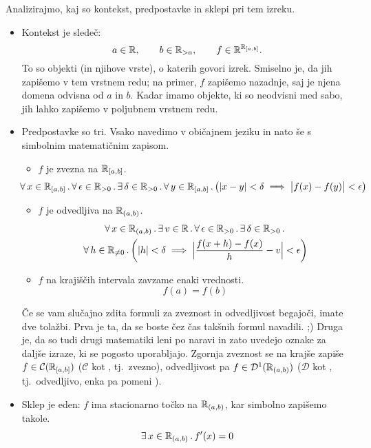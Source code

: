 	Analizirajmo, kaj so kontekst, predpostavke in sklepi pri tem izreku.
	
	\begin{itemize}
		\item
			Kontekst je sledeč:
			\[a \in \mathbb{R}, \qquad b \in \mathbb{R}_{> a}, \qquad f \in \mathbb{R}^{{\mathbb{R}}_{[a, b]}}.\]
			To so objekti (in njihove vrste), o katerih govori izrek. Smiselno je, da jih zapišemo v tem vrstnem redu; na primer, $f$ zapišemo nazadnje, saj je njena domena odvisna od $a$ in $b$. Kadar imamo objekte, ki so neodvisni med sabo, jih lahko zapišemo v poljubnem vrstnem redu.
		\item
			Predpostavke so tri. Vsako navedimo v običajnem jeziku in nato še s simbolnim matematičnim zapisom.
			\begin{itemize}
				\item
					$f$ je zvezna na ${\mathbb{R}}_{[a, b]}$.
					\[
						\hspace{-2em}
						\xall{x}[\intcc{a}{b}]{
							\xall{\epsilon}[\RR_{> 0}]{
								\xsome{\delta}[\RR_{> 0}]{
									\all{y}[\intcc{a}{b}]{
										|x - y| < \delta \implies \big|f(x) - f(y)\big| < \epsilon
									}
								}
							}
						}
					\]
				\item
					$f$ je odvedljiva na ${\mathbb{R}}_{(a, b)}$.
					\begin{multline*}
						\xall{x}[\intoo{a}{b}]{
							\xsome{v}[\RR]{
								\xall{\epsilon}[\RR_{> 0}]{
									\xsome{\delta}[\RR_{> 0}]{
									}
								}
							}
						}\\
						\all{h}[\RR_{\neq 0}]{
							|h| < \delta \implies \Big|\frac{f(x + h) - f(x)}{h} - v\Big| < \epsilon
						}
					\end{multline*}
				\item
					$f$ na krajiščih intervala zavzame enaki vrednosti.
					\[f(a) = f(b)\]
			\end{itemize}
			Če se vam slučajno zdita formuli za zveznost in odvedljivost begajoči, imate dve tolažbi. Prva je ta, da se boste čez čas takšnih formul navadili. ;) Druga je, da so tudi drugi matematiki leni po naravi in zato uvedejo oznake za daljše izraze, ki se pogosto uporabljajo. Zgornja zveznost se na krajše zapiše $f \in \mathcal{C}({\mathbb{R}}_{[a, b]})$ ($\mathcal{C}$ kot , tj.~zvezno), odvedljivost pa $f \in \mathcal{D}^1({\mathbb{R}}_{(a, b)})$ ($\mathcal{D}$ kot , tj.~odvedljivo, enka pa pomeni ).
		\item
			Sklep je eden: $f$ ima stacionarno točko na ${\mathbb{R}}_{(a, b)}$, kar simbolno zapišemo takole.
			\[\xsome{x}[\intoo{a}{b}]{f'(x) = 0}\]
	\end{itemize}
	
